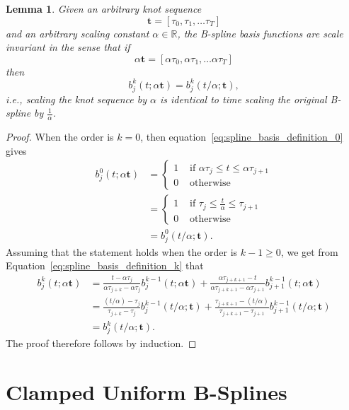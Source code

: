 \documentclass{article}
\newtheorem{lemma}[theorem]{Lemma}
\begin{document}
\begin{lemma}\label{lem:bases_are_scale_invariant}
Given an arbitrary knot sequence
\[
\mathbf{t} = [\tau_0, \tau_1, \dots \tau_T]
\]
and an arbitrary scaling constant $\alpha\in\mathbb{R}$, the B-spline basis functions are scale invariant in the sense that
if 
\[
\alpha\mathbf{t} = [\alpha\tau_0, \alpha\tau_1, \dots \alpha\tau_T]
\]
then
\[
b_j^k(t; \alpha\mathbf{t}) = b_j^k(t/\alpha; \mathbf{t}),
\]
i.e., scaling the knot sequence by $\alpha$ is identical to time scaling the original B-spline by $\frac{1}{\alpha}$.
\end{lemma}
\begin{proof}
When the order is $k=0$, then equation~\eqref{eq:spline_basis_definition_0} gives
\begin{align*}
	b_j^0(t; \alpha\mathbf{t}) &= \begin{cases} 1 & \text{~if~} \alpha\tau_j \leq t \leq \alpha\tau_{j+1} \\ 
 									 				   0 & \text{~otherwise} 
 					   					 \end{cases} \\
 					   				   &= \begin{cases} 1 & \text{~if~} \tau_j \leq \frac{t}{\alpha} \leq \tau_{j+1} \\ 
 									 				   0 & \text{~otherwise} 
 					   					 \end{cases} \\ 	
 					   				   &= b_j^0(t/\alpha; \mathbf{t}).
\end{align*}
Assuming that the statement holds when the order is $k-1\geq 0$, we get from 
Equation~\eqref{eq:spline_basis_definition_k} that
\begin{align*}
b_j^k(t; \alpha\mathbf{t}) &= \frac{t-\alpha\tau_j}{\alpha\tau_{j+k}-
\alpha\tau_j} b_j^{k-1}(t; \alpha\mathbf{t}) + \frac{\alpha\tau_{j+k+1}-t}{\alpha\tau_{j+k+1}-\alpha\tau_{j+1}} b_{j+1}^{k-1}(t; \alpha\mathbf{t}) \\
&= \frac{(t/\alpha)-\tau_j}{\tau_{j+k}-
\tau_j} b_j^{k-1}(t/\alpha; \mathbf{t}) + \frac{\tau_{j+k+1}-(t/\alpha)}{\tau_{j+k+1}-\tau_{j+1}} b_{j+1}^{k-1}(t/\alpha; \mathbf{t}) \\
&= b_j^k(t/\alpha; \mathbf{t}).
\end{align*}
The proof therefore follows by induction.
\end{proof}


\section{Clamped Uniform B-Splines}
\end{document}
